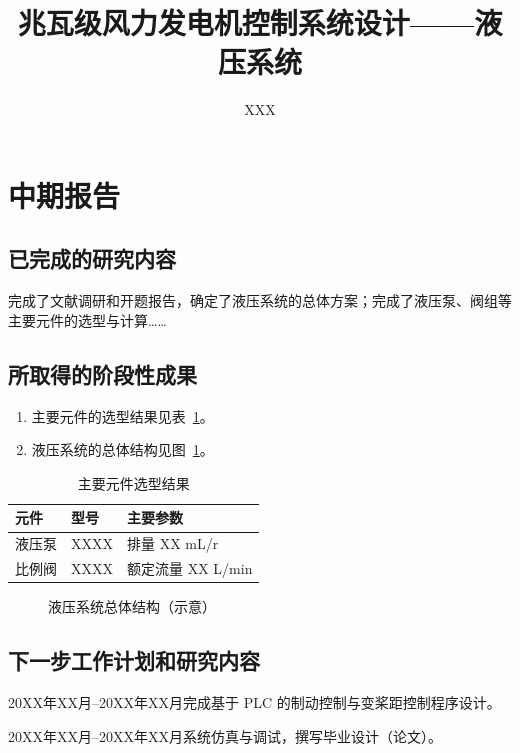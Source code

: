 \documentclass{sdjumidterm}
\title{兆瓦级风力发电机控制系统设计——液压系统}
\author{XXX}
\begin{document}
\maketitle

\section{中期报告}
\subsection{已完成的研究内容}
完成了文献调研和开题报告，确定了液压系统的总体方案；完成了液压泵、阀组等主要元件的选型与计算……

\subsection{所取得的阶段性成果}
\begin{enumerate}
  \item 主要元件的选型结果见表~\ref{tab:select}。
  \item 液压系统的总体结构见图~\ref{fig:scheme}。
\end{enumerate}

\begin{table}
  \caption{主要元件选型结果}\label{tab:select}
  \begin{tabular}{lll}
    \toprule
    元件 & 型号 & 主要参数 \\
    \midrule
    液压泵 & XXXX & 排量 XX mL/r \\
    比例阀 & XXXX & 额定流量 XX L/min \\
    \bottomrule
  \end{tabular}
\end{table}

\begin{figure}
  \caption{液压系统总体结构（示意）}\label{fig:scheme}
\end{figure}

\subsection{下一步工作计划和研究内容}
\begin{schedule}
  \item{20XX年XX月--20XX年XX月}{完成基于 PLC 的制动控制与变桨距控制程序设计。}
  \item{20XX年XX月--20XX年XX月}{系统仿真与调试，撰写毕业设计（论文）。}
\end{schedule}

\supervisoropinion{}        %
\committeeconclusion{}      %
\end{document}
